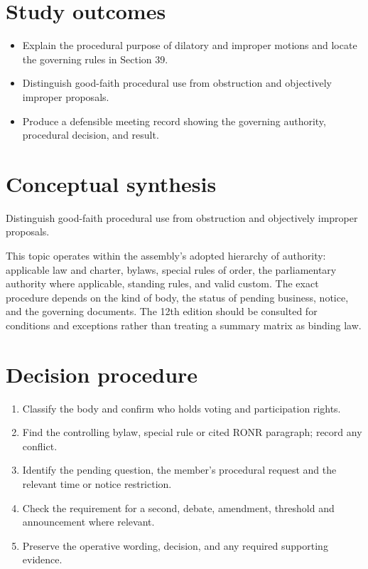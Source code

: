\documentclass[11pt]{article}
\begin{document}
\SuiteOpen
{}
\section{Study outcomes}
\begin{itemize}[leftmargin=*,itemsep=4pt]
\item Explain the procedural purpose of dilatory and improper motions and locate the governing rules in Section 39.
\item Distinguish good-faith procedural use from obstruction and objectively improper proposals.
\item Produce a defensible meeting record showing the governing authority, procedural decision, and result.
\end{itemize}

\section{Conceptual synthesis}
Distinguish good-faith procedural use from obstruction and objectively improper proposals.

This topic operates within the assembly’s adopted hierarchy of authority: applicable law and charter, bylaws, special rules of order, the parliamentary authority where applicable, standing rules, and valid custom. The exact procedure depends on the kind of body, the status of pending business, notice, and the governing documents. The 12th edition should be consulted for conditions and exceptions rather than treating a summary matrix as binding law.
\section{Decision procedure}
\begin{enumerate}[leftmargin=*,itemsep=4pt]
\item Classify the body and confirm who holds voting and participation rights.
\item Find the controlling bylaw, special rule or cited RONR paragraph; record any conflict.
\item Identify the pending question, the member’s procedural request and the relevant time or notice restriction.
\item Check the requirement for a second, debate, amendment, threshold and announcement where relevant.
\item Preserve the operative wording, decision, and any required supporting evidence.
\end{enumerate}
\end{document}
